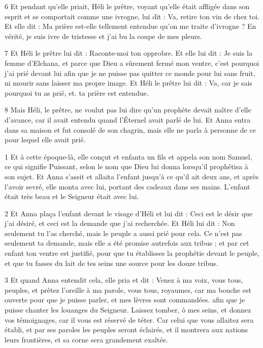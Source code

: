 \par 6 Et pendant qu'elle priait, Héli le prêtre, voyant qu'elle était affligée dans son esprit et se comportait comme une ivrogne, lui dit : Va, retire ton vin de chez toi. Et elle dit : Ma prière est-elle tellement entendue qu'on me traite d'ivrogne ? En vérité, je suis ivre de tristesse et j'ai bu la coupe de mes pleurs.

\par 7 Et Héli le prêtre lui dit : Raconte-moi ton opprobre. Et elle lui dit : Je suis la femme d'Elchana, et parce que Dieu a sûrement fermé mon ventre, c'est pourquoi j'ai prié devant lui afin que je ne puisse pas quitter ce monde pour lui sans fruit, ni mourir sans laisser ma propre image. Et Héli le prêtre lui dit : Va, car je sais pourquoi tu as prié, et. ta prière est entendue.

\par 8 Mais Héli, le prêtre, ne voulut pas lui dire qu'un prophète devait naître d'elle d'avance, car il avait entendu quand l'Éternel avait parlé de lui. Et Anna entra dans sa maison et fut consolé de son chagrin, mais elle ne parla à personne de ce pour lequel elle avait prié.


\par 1 Et à cette époque-là, elle conçut et enfanta un fils et appela son nom Samuel, ce qui signifie Puissant, selon le nom que Dieu lui donna lorsqu'il prophétisa à son sujet. Et Anna s'assit et allaita l'enfant jusqu'à ce qu'il ait deux ans, et après l'avoir sevré, elle monta avec lui, portant des cadeaux dans ses mains. L'enfant était très beau et le Seigneur était avec lui.

\par 2 Et Anna plaça l'enfant devant le visage d'Héli et lui dit : Ceci est le désir que j'ai désiré, et ceci est la demande que j'ai recherchée. Et Héli lui dit : Non seulement tu l'as cherché, mais le peuple a aussi prié pour cela. Ce n'est pas seulement ta demande, mais elle a été promise autrefois aux tribus ; et par cet enfant ton ventre est justifié, pour que tu établisses la prophétie devant le peuple, et que tu fasses du lait de tes seins une source pour les douze tribus.

\par 3 Et quand Anna entendit cela, elle pria et dit : Venez à ma voix, vous tous, peuples, et prêtez l'oreille à ma parole, vous tous, royaumes, car ma bouche est ouverte pour que je puisse parler, et mes lèvres sont commandées. afin que je puisse chanter les louanges du Seigneur. Laissez tomber, ô mes seins, et donnez vos témoignages, car il vous est réservé de téter. Car celui que vous allaitez sera établi, et par ses paroles les peuples seront éclairés, et il montrera aux nations leurs frontières, et sa corne sera grandement exaltée.


